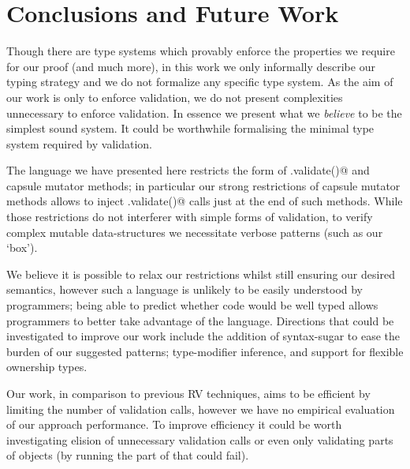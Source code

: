 \section{Conclusions and Future Work}
Though there are type systems which provably enforce the properties we require for our proof (and much more),
in this work we only informally describe our typing strategy and we
do not formalize any specific type system.
As the aim of our work is only to enforce validation, we do not present complexities unnecessary to enforce validation. 
In essence we present what we \emph{believe} to be the simplest sound system.
It could be worthwhile formalising the minimal type system required by validation.






The language we have presented here restricts the form of \Q@.validate()@
and capsule mutator methods; in particular
our strong restrictions of capsule mutator methods
allows to inject \Q@.validate()@ calls just at the end of such methods.
While those restrictions do not interferer with simple
forms of validation, to verify complex mutable data-structures we necessitate verbose patterns (such as our `box').

We believe it is possible to relax our restrictions whilst
still ensuring our desired semantics, however such a language is unlikely to be easily understood by programmers;
being able to predict whether code would be well typed allows programmers
to better take advantage of the language.
Directions that could be investigated to improve our work include the addition of syntax-sugar to ease the burden of our suggested patterns; type-modifier inference, and support for flexible ownership types.

Our work, in comparison to previous RV techniques, aims to be efficient by limiting the number of validation calls, however we have no empirical evaluation of our approach performance.
To improve efficiency it could be worth investigating elision of unnecessary validation calls
or even only validating parts of objects (by running the part of \Q@validate@ that could fail).